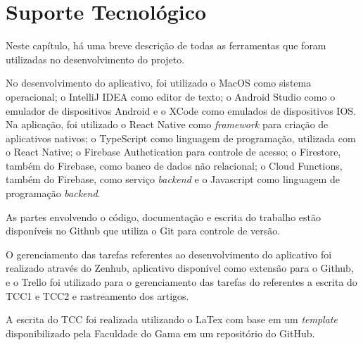 \chapter[Suporte Tecnológico]{Suporte Tecnológico}
\label{ch:suporte}

Neste capítulo, há uma breve descrição de todas as ferramentas que foram 
utilizadas no desenvolvimento do projeto. 

No desenvolvimento do aplicativo, foi utilizado o MacOS como sistema 
operacional; o IntelliJ IDEA como editor de texto; o Android Studio como 
o emulador de dispositivos Android e o XCode como emulados de dispositivos IOS. 
Na aplicação, foi utilizado o React Native 
como \emph{framework} para criação de aplicativos nativos; o TypeScript como linguagem 
de programação, utilizada com o React Native; o Firebase Authetication para controle de acesso; 
o Firestore, também do Firebase, como banco de dados não relacional; o Cloud Functions, também do Firebase,
como serviço \emph{backend} e o Javascript 
como linguagem de programação \emph{backend}.

As partes envolvendo o código, documentação e escrita do trabalho estão disponíveis 
no Github que utiliza o Git para controle de versão.

O gerenciamento das tarefas referentes ao desenvolvimento do aplicativo foi realizado através do Zenhub, 
aplicativo disponível como extensão para o Github, 
e o Trello foi utilizado para o gerenciamento das tarefas do referentes a escrita do TCC1 e TCC2 e 
rastreamento dos artigos. 

A escrita do TCC foi realizada utilizando o LaTex com base em um \emph{template} 
disponibilizado pela Faculdade do Gama em um repositório do GitHub. 

